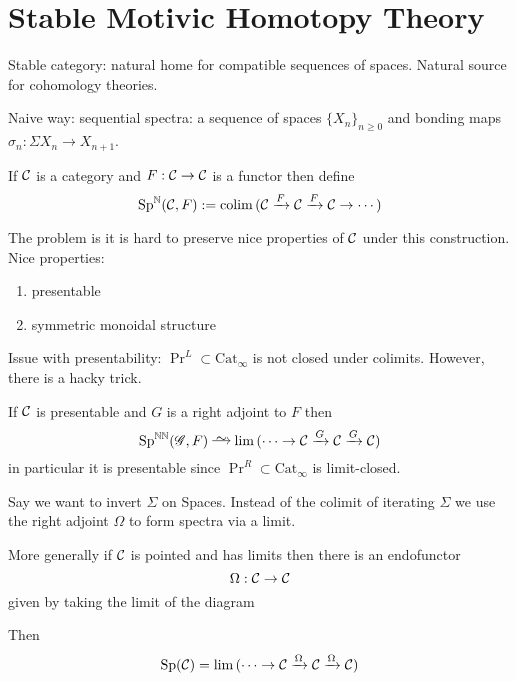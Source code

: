 \documentclass[12pt]{article}
\begin{document}
\section{Stable Motivic Homotopy Theory}

\newcommand{\Cat}{\mathrm{Cat}}

Stable category: natural home for compatible sequences of spaces. Natural source for cohomology theories. 
\par 
Naive way: sequential spectra: a sequence of spaces $\{ X_n \}_{n \ge 0}$ and bonding maps $\sigma_n : \Sigma X_n \to X_{n+1}$.

\begin{defn}
If $\mathcal{C}$ is a category and $F : \mathcal{C} \to \mathcal{C}$ is a functor then define
\[ \mathrm{Sp}^{\mathbb{N}}(\mathcal{C}, F) := \operatorname*{\mathrm{colim}}{( \mathcal{C} \xrightarrow{F} \mathcal{C} \xrightarrow{F} \mathcal{C} \to \cdots)} \]
\end{defn}

The problem is it is hard to preserve nice properties of $\mathcal{C}$ under this construction. Nice properties:
\begin{enumerate}
\item presentable
\item symmetric monoidal structure
\end{enumerate}

Issue with presentability: $\Pr^L \subset \Cat_{\infty}$ is not closed under colimits. However, there is a hacky trick.

\begin{prop}
If $\mathcal{C}$ is presentable and $G$ is a right adjoint to $F$ then
\[ \Sp^{\NN}(\G, F) \iso \lim{(\cdots \to \C \xrightarrow{G} \C \xrightarrow{G} \C)} \]
in particular it is presentable since $\Pr^R \subset \Cat_{\infty}$ is limit-closed. 
\end{prop}

\begin{example}
Say we want to invert $\Sigma$ on Spaces. Instead of the colimit of iterating $\Sigma$ we use the right adjoint $\Omega$ to form spectra via a limit. 
\end{example}

More generally if $\mathcal{C}$ is pointed and has limits then there is an endofunctor
\[ \Omega : \mathcal{C} \to \mathcal{C} \]
given by taking the limit of the diagram
\begin{center}
\end{center}
Then 
\[ \mathrm{Sp}(\mathcal{C}) = \lim{( \cdots \to \mathcal{C}\xrightarrow{\Omega} \mathcal{C}\xrightarrow{\Omega} \mathcal{C})} \]
\end{document}
